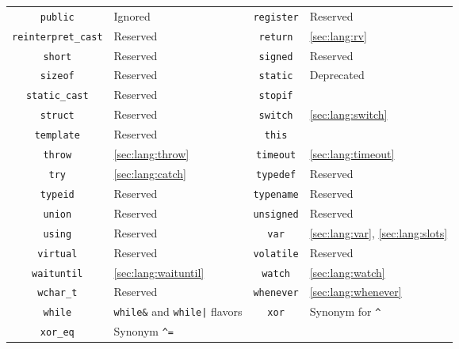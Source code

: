 \begin{tabular}{|c|l||c|l|}
  \lstinline"public" & Ignored                                  &
\lstinline"register" & Reserved                                 \\
\lstinline"reinterpret_cast" & Reserved                                 &
  \lstinline"return" & \autoref{sec:lang:rv}                    \\
   \lstinline"short" & Reserved                                 &
  \lstinline"signed" & Reserved                                 \\
  \lstinline"sizeof" & Reserved                                 &
  \lstinline"static" & Deprecated                               \\
\lstinline"static_cast" & Reserved                                 &
  \lstinline"stopif" &                                          \\
  \lstinline"struct" & Reserved                                 &
  \lstinline"switch" & \autoref{sec:lang:switch}                \\
\lstinline"template" & Reserved                                 &
    \lstinline"this" &                                          \\
   \lstinline"throw" & \autoref{sec:lang:throw}                 &
 \lstinline"timeout" & \autoref{sec:lang:timeout}               \\
     \lstinline"try" & \autoref{sec:lang:catch}                 &
 \lstinline"typedef" & Reserved                                 \\
  \lstinline"typeid" & Reserved                                 &
\lstinline"typename" & Reserved                                 \\
   \lstinline"union" & Reserved                                 &
\lstinline"unsigned" & Reserved                                 \\
   \lstinline"using" & Reserved                                 &
     \lstinline"var" & \autoref{sec:lang:var}, \autoref{sec:lang:slots} \\
 \lstinline"virtual" & Reserved                                 &
\lstinline"volatile" & Reserved                                 \\
\lstinline"waituntil" & \autoref{sec:lang:waituntil}             &
   \lstinline"watch" & \autoref{sec:lang:watch}                 \\
 \lstinline"wchar_t" & Reserved                                 &
\lstinline"whenever" & \autoref{sec:lang:whenever}              \\
   \lstinline"while" & \lstinline|while&| and \lstinline-while|- flavors &
     \lstinline"xor" & Synonym for \lstinline|^|                \\
  \lstinline"xor_eq" & Synonym \lstinline|^=|                   &
\\
  \hline
\end{tabular}
